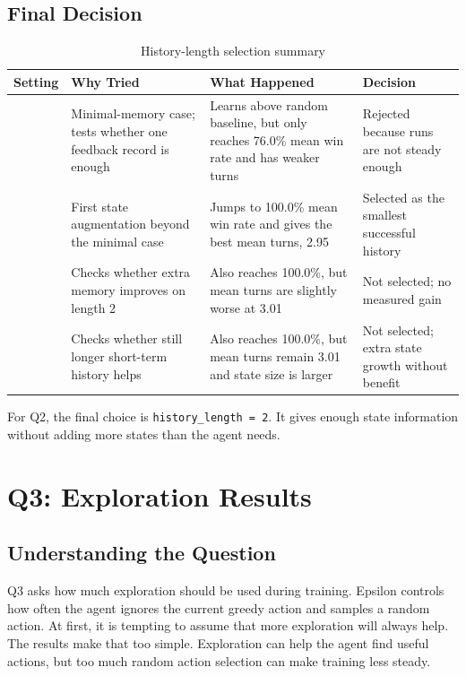\documentclass[11pt,a4paper]{article}
\begin{document}
\subsection{Final Decision}

\begin{table}[H]
\centering
\caption{History-length selection summary}
\label{tab:history-summary}
\small
\begin{tabular}{@{}>{\raggedright\arraybackslash}p{1.2cm} >{\raggedright\arraybackslash}p{3.2cm} >{\raggedright\arraybackslash}p{4.5cm} >{\raggedright\arraybackslash}p{3.7cm}@{}}
\toprule
Setting & Why Tried & What Happened & Decision \\
\midrule
1 & Minimal-memory case; tests whether one feedback record is enough & Learns above random baseline, but only reaches 76.0\% mean win rate and has weaker turns & Rejected because runs are not steady enough \\
2 & First state augmentation beyond the minimal case & Jumps to 100.0\% mean win rate and gives the best mean turns, 2.95 & Selected as the smallest successful history \\
3 & Checks whether extra memory improves on length 2 & Also reaches 100.0\%, but mean turns are slightly worse at 3.01 & Not selected; no measured gain \\
4 & Checks whether still longer short-term history helps & Also reaches 100.0\%, but mean turns remain 3.01 and state size is larger & Not selected; extra state growth without benefit \\
\bottomrule
\end{tabular}
\end{table}

For Q2, the final choice is \texttt{history\_length = 2}. It gives enough state information without adding more states than the agent needs.

\section{Q3: Exploration Results}

\subsection{Understanding the Question}

Q3 asks how much exploration should be used during training. Epsilon controls how often the agent ignores the current greedy action and samples a random action. At first, it is tempting to assume that more exploration will always help. The results make that too simple. Exploration can help the agent find useful actions, but too much random action selection can make training less steady.
\end{document}
